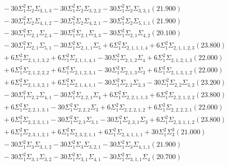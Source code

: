 \documentclass[12pt]{article}
\begin{document}
\begin{landscape}
\begin{align*}
		&\quad\quad -30\Sigma_{1}^{2}\Sigma_{2}\Sigma_{3,1,3}-30\Sigma_{1}^{2}\Sigma_{2}\Sigma_{3,2,2}-30\Sigma_{1}^{2}\Sigma_{2}\Sigma_{3,3,1}(21.900) \\ 
		&\quad\quad -30\Sigma_{1}^{2}\Sigma_{2}\Sigma_{4,1,2}-30\Sigma_{1}^{2}\Sigma_{2}\Sigma_{4,2,1}-30\Sigma_{1}^{2}\Sigma_{2}\Sigma_{5,1,1}(21.900) \\ 
		&\quad\quad -30\Sigma_{1}^{2}\Sigma_{2,1}\Sigma_{2,4}-30\Sigma_{1}^{2}\Sigma_{2,1}\Sigma_{3,3}-30\Sigma_{1}^{2}\Sigma_{2,1}\Sigma_{4,2}(20.100) \\ 
		&\quad\quad -30\Sigma_{1}^{2}\Sigma_{2,1}\Sigma_{5,1}-30\Sigma_{1}^{2}\Sigma_{2,1,1}\Sigma_{5}+6\Sigma_{1}^{2}\Sigma_{2,1,1,1,4}+6\Sigma_{1}^{2}\Sigma_{2,1,1,2,3}(23.800) \\ 
		&\quad\quad +6\Sigma_{1}^{2}\Sigma_{2,1,1,3,2}+6\Sigma_{1}^{2}\Sigma_{2,1,1,4,1}-30\Sigma_{1}^{2}\Sigma_{2,1,2}\Sigma_{4}+6\Sigma_{1}^{2}\Sigma_{2,1,2,1,3}(22.000) \\ 
		&\quad\quad +6\Sigma_{1}^{2}\Sigma_{2,1,2,2,2}+6\Sigma_{1}^{2}\Sigma_{2,1,2,3,1}-30\Sigma_{1}^{2}\Sigma_{2,1,3}\Sigma_{3}+6\Sigma_{1}^{2}\Sigma_{2,1,3,1,2}(22.000) \\ 
		&\quad\quad +6\Sigma_{1}^{2}\Sigma_{2,1,3,2,1}+6\Sigma_{1}^{2}\Sigma_{2,1,4,1,1}-30\Sigma_{1}^{2}\Sigma_{2,2}\Sigma_{2,3}-30\Sigma_{1}^{2}\Sigma_{2,2}\Sigma_{3,2}(23.200) \\ 
		&\quad\quad -30\Sigma_{1}^{2}\Sigma_{2,2}\Sigma_{4,1}-30\Sigma_{1}^{2}\Sigma_{2,2,1}\Sigma_{4}+6\Sigma_{1}^{2}\Sigma_{2,2,1,1,3}+6\Sigma_{1}^{2}\Sigma_{2,2,1,2,2}(23.800) \\ 
		&\quad\quad +6\Sigma_{1}^{2}\Sigma_{2,2,1,3,1}-30\Sigma_{1}^{2}\Sigma_{2,2,2}\Sigma_{3}+6\Sigma_{1}^{2}\Sigma_{2,2,2,1,2}+6\Sigma_{1}^{2}\Sigma_{2,2,2,2,1}(22.000) \\ 
		&\quad\quad +6\Sigma_{1}^{2}\Sigma_{2,2,3,1,1}-30\Sigma_{1}^{2}\Sigma_{2,3}\Sigma_{3,1}-30\Sigma_{1}^{2}\Sigma_{2,3,1}\Sigma_{3}+6\Sigma_{1}^{2}\Sigma_{2,3,1,1,2}(23.800) \\ 
		&\quad\quad +6\Sigma_{1}^{2}\Sigma_{2,3,1,2,1}+6\Sigma_{1}^{2}\Sigma_{2,3,2,1,1}+6\Sigma_{1}^{2}\Sigma_{2,4,1,1,1}+30\Sigma_{1}^{2}\Sigma_{3}^{3}(21.000) \\ 
		&\quad\quad -30\Sigma_{1}^{2}\Sigma_{3}\Sigma_{3,1,2}-30\Sigma_{1}^{2}\Sigma_{3}\Sigma_{3,2,1}-30\Sigma_{1}^{2}\Sigma_{3}\Sigma_{4,1,1}(21.900) \\ 
		&\quad\quad -30\Sigma_{1}^{2}\Sigma_{3,1}\Sigma_{3,2}-30\Sigma_{1}^{2}\Sigma_{3,1}\Sigma_{4,1}-30\Sigma_{1}^{2}\Sigma_{3,1,1}\Sigma_{4}(20.700) \\ 

\end{align*}
\end{landscape}
\end{document}
